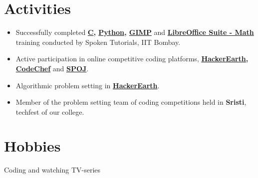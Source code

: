 \documentclass[margin, centered, a4paper]{res}
\begin{document}
\begin{resume}
\section{Activities}
\begin{itemize}[leftmargin=*]
	\item
	Successfully completed \textbf{\href{https://goo.gl/NxdY6T}{C}, \href{https://goo.gl/mLoMF3}{Python}, \href{https://goo.gl/rQg0Dz}{GIMP}} and \textbf{\href{https://goo.gl/i67WIz}{LibreOffice Suite - Math}} training conducted by Spoken Tutorials, IIT Bombay.
	\item
	Active participation in online competitive coding platforms, \textbf{\href{https://www.hackerearth.com/@abhisek17}{HackerEarth}, \href{https://www.codechef.com/users/abhisek_ch}{CodeChef}} and \textbf{\href{http://www.spoj.com/users/abhisekssp4025/}{SPOJ}}.
	\item
	Algorithmic problem setting in \textbf{\href{https://hackerearth.com}{HackerEarth}}.
	\item
	Member of the problem setting team of coding competitions held in \textbf{Sristi}, techfest of our college.
\end{itemize}

\section{Hobbies}
Coding and watching TV-series
\end{resume}
\end{document}

